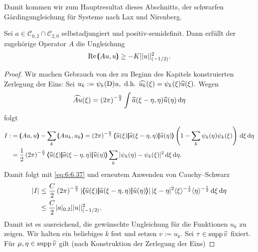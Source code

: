 Damit kommen wir zum Hauptresultat dieses Abschnitts, der schwarfen G\r{a}rdingungleichung für Systeme nach Lax und Nirenberg.

\begin{thm}
Sei $a\in\mathcal{C}_{0,2}\cap\mathcal{C}_{2,0}$ selbstadjungiert und positiv-semidefinit. Dann erfüllt der zugehörige Operator $A$ die Ungleichung
\begin{equation}
	\operatorname{Re} \pmb(Au,u\pmb) \ge - K|| u||_{\left(-{1}/{2}\right)}^2.
\end{equation}
\end{thm}
\begin{proof}
	Wir machen Gebrauch von der zu Beginn des Kapitels konstruierten Zerlegung der Eins: Sei $	u_k:= \psi_k(\mathrm D)u, \text{ d.h. } \widehat{u_k}(\xi) = \psi_k(\xi) \widehat{u}(\xi).$ Wegen 
\begin{equation}
	\widehat{Au}(\xi) = \left(2\pi\right)^{-\frac{n}{2}}\int \widehat{a}(\xi-\eta,\eta)\widehat{u}(\eta)\,\mathrm d \eta
\end{equation}	 
folgt
\begin{equation}
\begin{split} I:&=\pmb(Au,u\pmb)-\sum\limits_k \pmb(Au_k,u_k\pmb) = \left(2\pi\right)^{-\frac{n}{2}}\relax \pmb\langle\widehat{u}(\xi)\pmb|\widehat{a}(\xi-\eta,\eta)\pmb|\widehat{u}(\eta)\pmb\rangle\left(1-\sum\limits_k \psi_k(\eta)\psi_k(\xi)\right)\,\mathrm d \xi\,\mathrm d\eta\notag\\
	&= \frac{1}{2}\left(2\pi\right)^{-\frac{n}{2}} \relax \pmb\langle\widehat{u}(\xi)\pmb|\widehat{a}(\xi-\eta,\eta)\pmb|\widehat{u}(\eta)\pmb\rangle\sum\limits_k\vert\psi_k(\eta)-\psi_k(\xi)\vert^2\,\mathrm d \xi\,\mathrm d\eta.
\end{split}
\end{equation}
Damit folgt mit \eqref{eq:6:6.37} und erneutem Anwenden von Cauchy--Schwarz
\begin{equation}
\begin{split}	
| I| &\le \frac{C}{2}\left(2\pi\right)^{-\frac{n}{2}}\relax| \pmb\langle\widehat{u}(\xi)\pmb|\widehat{a}(\xi-\eta,\eta)\pmb|\widehat{u}(\eta)\pmb\rangle| \, |\xi-\eta|^2\langle \xi\rangle^{-\frac{1}{2}} \langle\eta\rangle^{-\frac{1}{2}}\,\mathrm d \xi \,\mathrm d \eta\\ 
& \le \frac{C}{2}| a|_{0,2}|| u||_{(-{1}/{2})}^2.
\end{split}
\end{equation}
Damit ist es ausreichend, die gewünschte Ungleichung für die Funktionen $u_k$ zu zeigen. Wir halten ein beliebiges $k$ fest und setzen $v:= u_k.$ Sei $\tau\in \operatorname{supp} \widehat{v}$ fixiert. Für $\mu, \eta \in \operatorname{supp} \widehat{v}$ gilt (nach Konstruktion der Zerlegung der Eins)

\end{proof}
